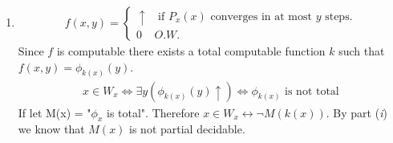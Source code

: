 \begin{enumerate}[label=\ilabel]
    \item 
        \begin{gather*}
            f(x, y) = \begin{cases}
                \uparrow \ \ \ \ \text{if } P_x(x) \text{ converges in at most $y$ steps.} \\
                0 \ \ \ \ \ O.W.
            \end{cases}
        \end{gather*}
        Since $f$ is computable there exists a total computable function $k$ such that $f(x, y) = \phi_{k(x)}(y)$.
        \begin{gather*}
            x \in W_x \iff \exists y (\phi_{k(x)} (y) \uparrow) \iff \phi_{k(x)} \text{ is not total}
        \end{gather*}
        If let M(x) = "$\phi_x$ is total". Therefore $x \in W_x \longleftrightarrow \neg M(k(x))$. By part (\textit{i}) we know that $M(x)$ is not partial decidable.
\end{enumerate}